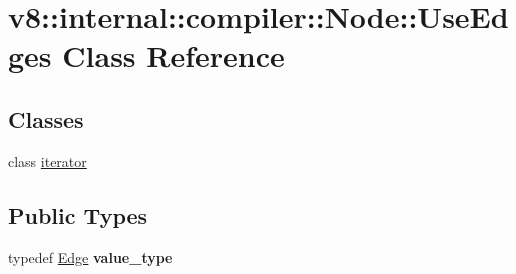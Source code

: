 \hypertarget{classv8_1_1internal_1_1compiler_1_1_node_1_1_use_edges}{}\section{v8\+:\+:internal\+:\+:compiler\+:\+:Node\+:\+:Use\+Edges Class Reference}
\label{classv8_1_1internal_1_1compiler_1_1_node_1_1_use_edges}
\subsection*{Classes}
\begin{DoxyCompactItemize}
\item 
class \hyperlink{classv8_1_1internal_1_1compiler_1_1_node_1_1_use_edges_1_1iterator}{iterator}
\end{DoxyCompactItemize}
\subsection*{Public Types}
\begin{DoxyCompactItemize}
\item 
typedef \hyperlink{classv8_1_1internal_1_1compiler_1_1_edge}{Edge} {\bfseries value\+\_\+type}\hypertarget{classv8_1_1internal_1_1compiler_1_1_node_1_1_use_edges_a06b09d5d04383a3503dde2eb8591a20a}{}\label{classv8_1_1internal_1_1compiler_1_1_node_1_1_use_edges_a06b09d5d04383a3503dde2eb8591a20a}

\end{DoxyCompactItemize}
